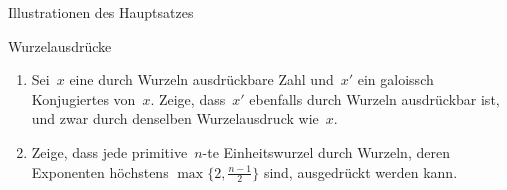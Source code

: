 \documentclass{algblatt}
\begin{document}
\begin{aufgabe}{Illustrationen des Hauptsatzes}
\begin{loesungE}
%
%
\end{loesungE}
\end{aufgabe}

\begin{aufgabe}{Wurzelausdrücke}
\begin{enumerate}
\item Sei~$x$ eine durch Wurzeln ausdrückbare Zahl und~$x'$ ein galoissch
Konjugiertes von~$x$. Zeige, dass~$x'$
ebenfalls durch Wurzeln ausdrückbar ist, und zwar durch
denselben Wurzelausdruck wie~$x$.
\item Zeige, dass jede primitive~$n$-te Einheitswurzel durch Wurzeln, deren
Exponenten höchstens $\max\{ 2, \frac{n-1}{2}
\}$ sind, ausgedrückt werden kann.
\end{enumerate}
\end{aufgabe}
\end{document}
